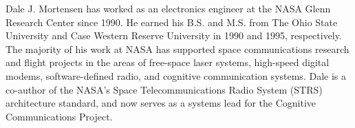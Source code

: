 \documentclass[journal]{IEEEtran}
\begin{document}
\vfill
\newpage
\begin{IEEEbiography}{Dale J. Mortensen}
has worked as an electronics engineer at the NASA Glenn Research Center since 1990. He earned his B.S. and M.S. from The Ohio State University and Case Western Reserve University in 1990 and 1995, respectively. The majority of his work at NASA has supported space communications research and flight projects in the areas of free-space laser systems, high-speed digital modems, software-defined radio, and cognitive communication systems. Dale is a co-author of the NASA's Space Telecommunications Radio System (STRS) architecture standard, and now serves as a systems lead for the Cognitive Communications Project.
\end{IEEEbiography}









\end{document}
